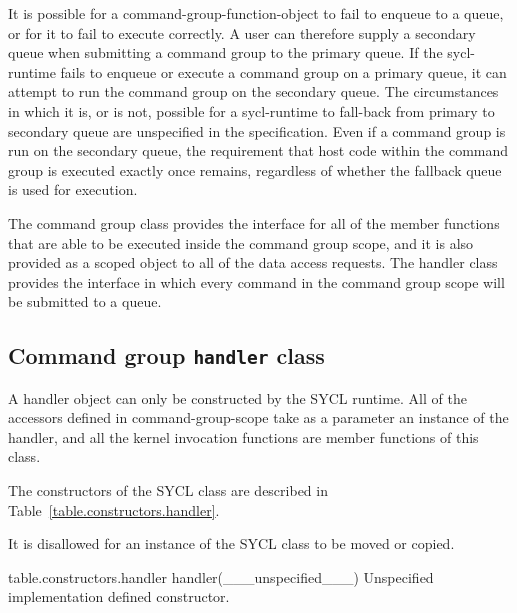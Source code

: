 It is possible for a \gls{command-group-function-object} to fail to enqueue to a queue,
or for it to fail to execute correctly. A user can therefore supply a secondary
queue when submitting a command group to the primary queue. If the \gls{sycl-runtime}
fails to enqueue or execute a command group on a primary queue, it can attempt
to run the command group on the secondary queue. The circumstances in which it
is, or is not, possible for a \gls{sycl-runtime} to fall-back from primary to
secondary queue are unspecified in the specification.  Even if a command group
is run on the secondary queue, the requirement that host code within the command group
is executed exactly once remains, regardless of whether the fallback queue is used for
execution.

The command group  class provides the interface
for all of the member functions that are able to be executed inside the command group
scope, and it is also provided as a scoped object to all of the data access
requests. The \gls{handler} class provides the interface
in which every command in the command group scope will be submitted to a queue.


\subsection{Command group \texttt{handler} class}
\label{sec:handlerClass}

A \gls{handler} object can only be constructed by the SYCL
runtime. All of the accessors defined in \gls{command-group-scope} take as a
parameter an instance of the \gls{handler}, and all the
kernel invocation functions are member functions of this class.

The constructors of the SYCL  class are described in Table~\ref{table.constructors.handler}.

It is disallowed for an instance of the SYCL  class to be moved or copied.



{table.constructors.handler}
  \addRow
    {handler(___unspecified___)}
    {
      Unspecified implementation defined constructor.
    }
\completeTable

